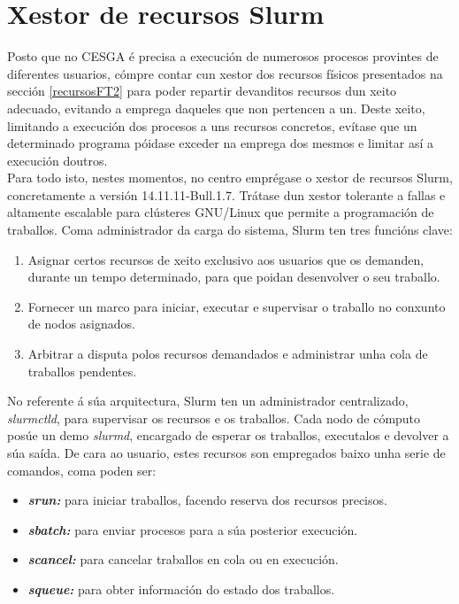\section{Xestor de recursos Slurm}
\label{infraestruturaSlurm}

Posto que no \gls{CESGA} é precisa a execución de numerosos procesos provintes de diferentes usuarios, cómpre contar cun xestor dos recursos físicos presentados na sección \ref{recursosFT2} para poder repartir devanditos recursos dun xeito adecuado, evitando a emprega daqueles que non pertencen a un. Deste xeito, limitando a execución dos procesos a uns recursos concretos, evítase que un determinado programa póidase exceder na emprega dos mesmos e limitar así a execución doutros.\\

Para todo isto, nestes momentos, no centro emprégase o xestor de recursos Slurm, concretamente a versión 14.11.11-Bull.1.7. Trátase dun xestor tolerante a fallas e altamente escalable para clústeres GNU/Linux que permite a programación de traballos. Coma administrador da carga do sistema, Slurm ten tres funcións clave:

\begin{enumerate}
\item Asignar certos recursos de xeito exclusivo aos usuarios que os demanden, durante un tempo determinado, para que poidan desenvolver o seu traballo.
\item Fornecer un marco para iniciar, executar e supervisar o traballo no conxunto de nodos asignados.
\item Arbitrar a disputa polos recursos demandados e administrar unha cola de traballos pendentes.
\end{enumerate}

No referente á súa arquitectura, Slurm ten un administrador centralizado, \textit{slurmctld}, para supervisar os recursos e os traballos. Cada nodo de cómputo posúe un demo \textit{slurmd}, encargado de esperar os traballos, executalos e devolver a súa saída. De cara ao usuario, estes recursos son empregados baixo unha serie de comandos, coma poden ser:

\begin{itemize}
    \item {\it \textbf{srun:}} para iniciar traballos, facendo reserva dos recursos precisos.
    \item {\it \textbf{sbatch:}} para enviar procesos para a súa posterior execución.
    \item {\it \textbf{scancel:}} para cancelar traballos en cola ou en execución.
    \item {\it \textbf{squeue:}} para obter información do estado dos traballos.
\end{itemize}

